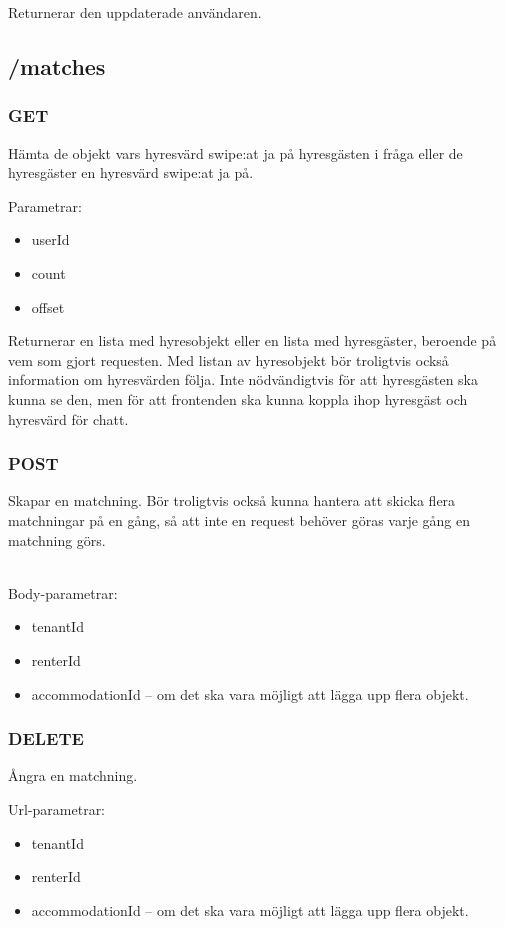 \documentclass{article}
\begin{document}
Returnerar den uppdaterade användaren.

\subsection {/matches}
\label{sub:/matches}

\subsubsection {GET}
\label{ssub:GET}

Hämta de objekt vars hyresvärd swipe:at ja på hyresgästen i fråga eller de hyresgäster en hyresvärd swipe:at ja på.

Parametrar:

\begin{itemize}
    \item userId 
    \item count
    \item offset
\end{itemize}

Returnerar en lista med hyresobjekt eller en lista med hyresgäster, beroende på vem som gjort requesten. Med listan av hyresobjekt bör troligtvis också
information om hyresvärden följa. Inte nödvändigtvis för att hyresgästen ska kunna se den, men för att frontenden ska kunna koppla ihop hyresgäst och
hyresvärd för chatt.

\subsubsection {POST}
\label{ssub:POST}

Skapar en matchning. Bör troligtvis också kunna hantera att skicka flera matchningar på en gång, så att inte en request behöver göras varje gång en
matchning görs.

\\Body-parametrar:

\begin{itemize}
    \item tenantId
    \item renterId
    \item accommodationId -- om det ska vara möjligt att lägga upp flera objekt.
\end{itemize}

\subsubsection {DELETE}
\label{ssub:DELETE}

Ångra en matchning.

Url-parametrar:

\begin{itemize}
    \item tenantId
    \item renterId
    \item accommodationId -- om det ska vara möjligt att lägga upp flera objekt.
\end{itemize}
\end{document}

